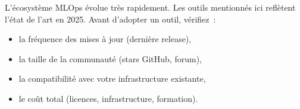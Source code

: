 \begin{remarque}
L'\'ecosyst\`eme MLOps \'evolue tr\`es rapidement. Les outils mentionn\'es
ici refl\`etent l'\'etat de l'art en 2025. Avant d'adopter un outil,
v\'erifiez~:
\begin{itemize}
  \item la fr\'equence des mises \`a jour (derni\`ere release),
  \item la taille de la communaut\'e (stars GitHub, forum),
  \item la compatibilit\'e avec votre infrastructure existante,
  \item le co\^ut total (licences, infrastructure, formation).
\end{itemize}
\end{remarque}
